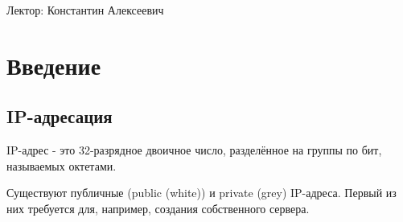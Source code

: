 




\noindent Лектор: Константин Алексеевич

\section{Введение}

\begin{figure}[h]
\end{figure}

\begin{figure}[h]
\end{figure}

\subsection{IP-адресация}

\begin{definition}[IP-адрес]
	IP-адрес - это 32-разрядное двоичное число, разделённое на группы по бит, называемых октетами.
\end{definition}

Существуют публичные (public (white)) и private (grey) IP-адреса. Первый из них требуется для, например, создания собственного сервера.



\newpage

\tableofcontents

